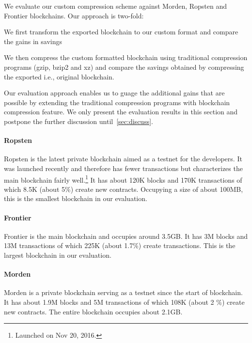 
We evaluate our custom compression scheme against Morden, Ropsten and Frontier blockchains.
Our approach is two-fold:
\begin{enumerate*}
	\item We first transform the exported blockchain to our custom format and compare the gains in savings
	\item We then compress the custom formatted blockchain using traditional compression programs (gzip, bzip2 and xz) and compare the savings obtained by compressing the exported i.e., original blockchain.
\end{enumerate*}
Our evaluation approach enables us to guage the additional gains that are possible by extending the traditional compression programs with blockchain compression feature. 
We only present the evaluation results in this section and 
postpone the further discussion until~\autoref{sec:discuss}. 

\paragraph{Ropsten}
Ropsten is the latest private blockchain aimed as a testnet for the \eth{} developers. It was launched recently and therefore has fewer transactions but characterizes the main blockchain fairly well.\footnote{Launched on Nov 20, 2016.}
It has about 120K blocks and 170K transactions of which 8.5K (about 5\%) create new contracts.
Occupying a size of about 100MB, this is the smallest blockchain in our evaluation. 
\paragraph{Frontier}
Frontier is the main \eth{} blockchain and occupies around 3.5GB. It has 3M blocks and 13M transactions of which 225K (about 1.7\%) create transactions. 
This is the largest blockchain in our evaluation.

\paragraph{Morden}
Morden is a private blockchain serving as a testnet since the start of \eth{} blockchain. 
It has about 1.9M blocks and 5M transactions of which 108K (about 2 \%) create new contracts. The entire blockchain occupies about 2.1GB.

